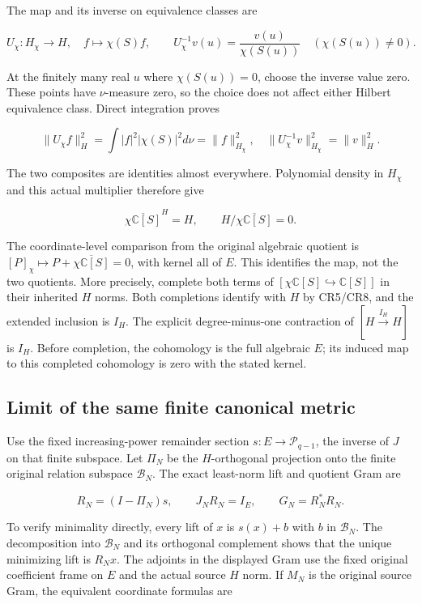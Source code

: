 \documentclass{article}
\begin{document}
The map and its inverse on equivalence classes are

\[
U_\chi:H_\chi\longrightarrow H,\quad f\longmapsto\chi(S)f,
\qquad
U_\chi^{-1}v(u)=\frac{v(u)}{\chi(S(u))}\quad(\chi(S(u))\ne0).
\tag{CR6}
\]

At the finitely many real \(u\) where \(\chi(S(u))=0\), choose the inverse value zero. These points have \(\nu\)-measure zero, so the choice does not affect either Hilbert equivalence class. Direct integration proves

\[
\|U_\chi f\|_H^2=\int|f|^2|\chi(S)|^2d\nu=\|f\|_{H_\chi}^2,
\quad
\|U_\chi^{-1}v\|_{H_\chi}^2=\|v\|_H^2.
\tag{CR7}
\]

The two composites are identities almost everywhere. Polynomial density in \(H_\chi\) and this actual multiplier therefore give

\[
\boxed{\overline{\chi\mathbb C[S]}^{H}=H,
\qquad H/\overline{\chi\mathbb C[S]}=0.}
\tag{CR8}
\]

The coordinate-level comparison from the original algebraic quotient is \([P]_\chi\mapsto P+\overline{\chi\mathbb C[S]}=0\), with kernel all of \(E\). This identifies the map, not the two quotients. More precisely, complete both terms of \([\chi\mathbb C[S]\hookrightarrow\mathbb C[S]]\) in their inherited \(H\) norms. Both completions identify with \(H\) by CR5/CR8, and the extended inclusion is \(I_H\). The explicit degree-minus-one contraction of \([H\xrightarrow{I_H}H]\) is \(I_H\). Before completion, the cohomology is the full algebraic \(E\); its induced map to this completed cohomology is zero with the stated kernel.

\subsection{Limit of the same finite canonical metric}\label{limit-of-the-same-finite-canonical-metric}

Use the fixed increasing-power remainder section \(s:E\to\mathcal P_{q-1}\), the inverse of \(J\) on that finite subspace. Let \(\Pi_N\) be the \(H\)-orthogonal projection onto the finite original relation subspace \(\mathcal B_N\). The exact least-norm lift and quotient Gram are

\[
R_N=(I-\Pi_N)s,\qquad J_NR_N=I_E,\qquad
G_N=R_N^*R_N.
\tag{CR9}
\]

To verify minimality directly, every lift of \(x\) is \(s(x)+b\) with \(b\) in \(\mathcal B_N\). The decomposition into \(\mathcal B_N\) and its orthogonal complement shows that the unique minimizing lift is \(R_Nx\). The adjoints in the displayed Gram use the fixed original coefficient frame on \(E\) and the actual source \(H\) norm. If \(M_N\) is the original source Gram, the equivalent coordinate formulas are
\end{document}
